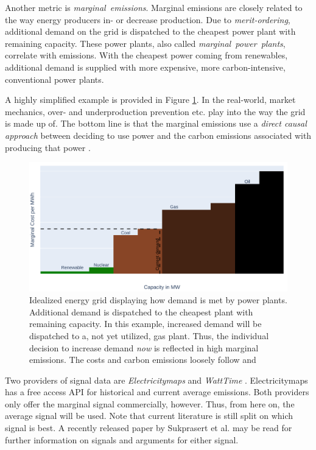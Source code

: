 Another metric is \emph{marginal~emissions}. 
Marginal emissions are closely related to the way energy producers in- or decrease production.
Due to \emph{merit-ordering}, additional demand on the grid is dispatched to the cheapest power plant with remaining capacity.
These power plants, also called \emph{marginal~power~plants}, correlate with emissions. 
With the cheapest power coming from renewables, additional demand is supplied with more expensive, more carbon-intensive, conventional power plants.

A highly simplified example is provided in Figure \ref{fig:marginal_example}.
In the real-world, market mechanics, over- and underproduction prevention etc. play into the way the grid is made up of.
The bottom line is that the marginal emissions use a \emph{direct causal approach} between deciding to use power and the carbon emissions associated with producing that power . 

\begin{figure}
    \includegraphics[width=\linewidth]{notebooks/marginal_emissions.pdf}
    \caption[short]{
        Idealized energy grid displaying how demand is met by power plants. 
        Additional demand is dispatched to the cheapest plant with remaining capacity. 
        In this example, increased demand will be dispatched to a, not yet utilized, gas plant.
        Thus, the individual decision to increase demand \emph{now} is reflected in high marginal emissions.
        The costs and carbon emissions loosely follow  and  
        }
    \label{fig:marginal_example}
\end{figure}

Two providers of signal data are \emph{Electricitymaps}  and \emph{WattTime} .
Electricitymaps has a free access API for historical and current average emissions. Both providers only offer the marginal signal commercially, however. 
Thus, from here on, the average signal will be used. 
Note that current literature is still split on which signal is best. 
A recently released paper by Sukprasert et al. \cite{sukprasert_limitations_2024} may be read for further information on signals and arguments for either signal.

